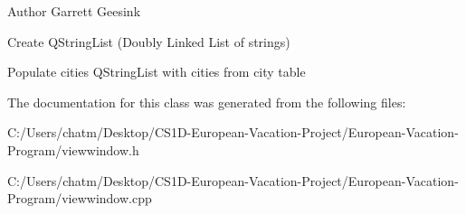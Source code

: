 \begin{DoxyAuthor}{Author}
Garrett Geesink 
\end{DoxyAuthor}
Create Q\+String\+List (Doubly Linked List of strings)

Populate cities Q\+String\+List with cities from city table 

The documentation for this class was generated from the following files\+:\begin{DoxyCompactItemize}
\item 
C\+:/\+Users/chatm/\+Desktop/\+C\+S1\+D-\/\+European-\/\+Vacation-\/\+Project/\+European-\/\+Vacation-\/\+Program/viewwindow.\+h\item 
C\+:/\+Users/chatm/\+Desktop/\+C\+S1\+D-\/\+European-\/\+Vacation-\/\+Project/\+European-\/\+Vacation-\/\+Program/viewwindow.\+cpp\end{DoxyCompactItemize}
